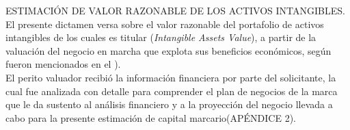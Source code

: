 
\begin{rightcolumn}
\textcolor{secundario}{ESTIMACI\'ON DE VALOR RAZONABLE DE LOS ACTIVOS INTANGIBLES.} El presente dictamen versa sobre el valor razonable del portafolio de activos intangibles de los cuales es titular \empresaSolicitante{}(\textit{Intangible Assets Value}), a partir de la valuaci\'on del negocio en marcha que explota sus beneficios econ\'omicos, seg\'un fueron mencionados en el ).\\[10pt]

El perito valuador recibi\'o la informaci\'on financiera por parte del solicitante, la cual fue analizada con detalle para comprender el plan de negocios de la marca que le da sustento al an\'alisis financiero y a la proyecci\'on del negocio llevada a cabo para la presente estimaci\'on de capital marcario(\textcolor{terciario}{AP\'ENDICE 2}).\\[10pt] 

\end{rightcolumn}

